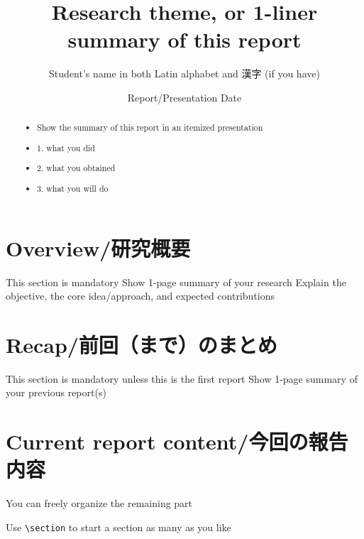 \documentclass[]{lrlabreport}
\title{\color{blue} Research theme, or 1-liner summary of this report}
\author{Student's name in both Latin alphabet and 漢字 (if you have)}
\date{Report/Presentation Date}
\begin{document}
\maketitle
\begin{abstract}
\noindent\begin{itemize}
    \item Show the summary of this report in an itemized presentation
    \item 1. what you did
    \item 2. what you obtained
    \item 3. what you will do
\end{itemize}
\end{abstract}
\thispagestyle{empty}


\section{Overview/研究概要}

\I This section is mandatory
\I Show 1-page summary of your research 
\I Explain the objective, the core idea/approach, and expected contributions


\section{Recap/前回（まで）のまとめ}

\I This section is mandatory unless this is the first report
\I Show 1-page summary of your previous report(s)


\section{Current report content/今回の報告内容}

\I You can freely organize the remaining part

\I Use \verb|\section| to start a section as many as you like
\end{document}
